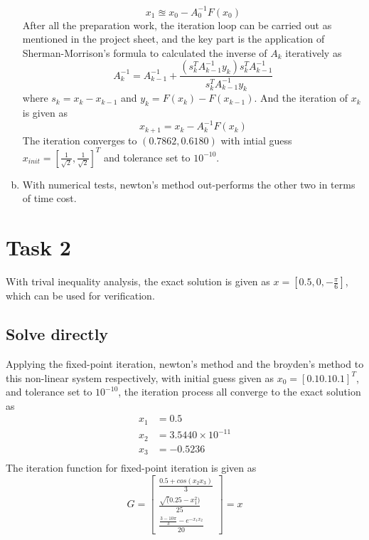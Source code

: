 \documentclass[paper=a4, fontsize=11pt]{scrartcl} %
\numberwithin{equation}{section} %
\numberwithin{figure}{section} %
\numberwithin{table}{section} %
\begin{document}
\begin{enumerate}[(a)]
			\begin{equation}
				x_1 \approxeq x_0 - A_0^{-1}F(x_0)
			\end{equation}
			After all the preparation work, the iteration loop can be carried out as mentioned in the project sheet, and the key part is the application of Sherman-Morrison's formula to calculated the inverse of $A_k$ iteratively as
			\begin{equation}
				A_k^{-1} = A_{k-1}^{-1} + \frac{(s_k^T A_{k-1}^{-1} y_k)s_k^T A_{k-1}^{-1}}{s_k^T A_{k-1}^{-1} y_k}
			\end{equation}
			where $s_k = x_k - x_{k-1}$ and $y_k = F(x_k) - F(x_{k-1})$. And the iteration of $x_k$ is given as
			\begin{equation}
				x_{k+1} = x_k - A_k^{-1}F(x_k)
			\end{equation}
			The iteration converges to $(0.7862, 0.6180)$ with intial guess $x_{init} = [\frac{1}{\sqrt{2}}, \frac{1}{\sqrt{2}}]^T$ and tolerance set to $10^{-10}$. 
		\item 
			With numerical tests, newton's method out-performs the other two in terms of time cost.
		
	\end{enumerate}

\section{Task 2}
	With trival inequality analysis, the exact solution is given as $x=[0.5, 0, -\frac{\pi}{6}]$, which can be used for verification.
	\subsection{Solve directly}
		Applying the fixed-point iteration, newton's method and the broyden's method to this non-linear system respectively, with initial guess given as $x_0 = [0.1 0.1 0.1]^T$, and tolerance set to $10^{-10}$, the iteration process all converge to the exact solution as
		\begin{equation}
			\begin{aligned}
				x_1 & = 0.5\\
				x_2 & = 3.5440\times 10^{-11}\\
				x_3 & = -0.5236\\
			\end{aligned}
		\end{equation}
		The iteration function for fixed-point iteration is given as
		\begin{equation}
			G =
			\begin{bmatrix}
				\frac{0.5+cos(x_2 x_3)}{3}\\
				\frac{\sqrt(0.25-x_1^2)}{25}\\
				\frac{\frac{3-10 \pi}{3}-e^{-x_1 x_2}}{20}
			\end{bmatrix}
			= x
		\end{equation}
		
\end{document}
